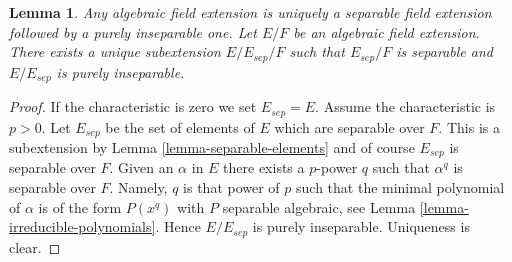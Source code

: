 \documentclass[10pt,a4paper]{amsart}
\newenvironment{slogan}{\comment}{\endcomment}
\theoremstyle{plain}
\newtheorem{lemma}[subsection]{Lemma}
\theoremstyle{definition}
\theoremstyle{remark}
\numberwithin{equation}{subsection}
\begin{document}
\begin{lemma}
\label{lemma-separable-first}
\begin{slogan}
Any algebraic field extension is uniquely a separable field extension
followed by a purely inseparable one.
\end{slogan}
Let $E/F$ be an algebraic field extension. There exists a unique subextension
$E/E_{sep}/F$ such that $E_{sep}/F$ is separable and $E/E_{sep}$ is
purely inseparable.
\end{lemma}

\begin{proof}
If the characteristic is zero we set $E_{sep} = E$. Assume the characteristic
is $p > 0$. Let $E_{sep}$ be the set of elements of $E$ which are separable
over $F$. This is a subextension by Lemma \ref{lemma-separable-elements}
and of course $E_{sep}$ is separable over $F$. Given an $\alpha$ in $E$
there exists a $p$-power $q$ such that $\alpha^q$ is separable over $F$.
Namely, $q$ is that power of $p$ such that the minimal polynomial of
$\alpha$ is of the form $P(x^q)$ with $P$ separable algebraic, see
Lemma \ref{lemma-irreducible-polynomials}. Hence $E/E_{sep}$ is purely
inseparable. Uniqueness is clear.
\end{proof}
\end{document}
